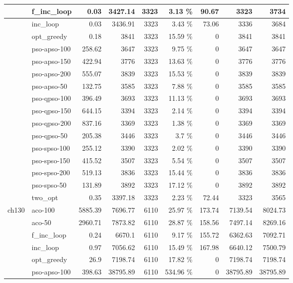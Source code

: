 \documentclass[conference]{IEEEtran}
\begin{document}
\begin{center}
\begin{longtable}[ht]{|l|l|r|r|r|r|r|r|r|}
 & f\_inc\_loop & 0.03 & 3427.14 & 3323 & 3.13 \% & 90.67 & 3323 & 3734 \\ \hline
 & inc\_loop & 0.03 & 3436.91 & 3323 & 3.43 \% & 73.06 & 3336 & 3684 \\ \hline
 & opt\_greedy & 0.18 & 3841 & 3323 & 15.59 \% & 0 & 3841 & 3841 \\ \hline
 & pso-apso-100 & 258.62 & 3647 & 3323 & 9.75 \% & 0 & 3647 & 3647 \\ \hline
 & pso-apso-150 & 422.94 & 3776 & 3323 & 13.63 \% & 0 & 3776 & 3776 \\ \hline
 & pso-apso-200 & 555.07 & 3839 & 3323 & 15.53 \% & 0 & 3839 & 3839 \\ \hline
 & pso-apso-50 & 132.75 & 3585 & 3323 & 7.88 \% & 0 & 3585 & 3585 \\ \hline
 & pso-qpso-100 & 396.49 & 3693 & 3323 & 11.13 \% & 0 & 3693 & 3693 \\ \hline
 & pso-qpso-150 & 644.15 & 3394 & 3323 & 2.14 \% & 0 & 3394 & 3394 \\ \hline
 & pso-qpso-200 & 837.16 & 3369 & 3323 & 1.38 \% & 0 & 3369 & 3369 \\ \hline
 & pso-qpso-50 & 205.38 & 3446 & 3323 & 3.7 \% & 0 & 3446 & 3446 \\ \hline
 & pso-spso-100 & 255.12 & 3390 & 3323 & 2.02 \% & 0 & 3390 & 3390 \\ \hline
 & pso-spso-150 & 415.52 & 3507 & 3323 & 5.54 \% & 0 & 3507 & 3507 \\ \hline
 & pso-spso-200 & 519.13 & 3836 & 3323 & 15.44 \% & 0 & 3836 & 3836 \\ \hline
 & pso-spso-50 & 131.89 & 3892 & 3323 & 17.12 \% & 0 & 3892 & 3892 \\ \hline
 & two\_opt & 0.35 & 3397.18 & 3323 & 2.23 \% & 72.44 & 3323 & 3565 \\ \hline
ch130 & aco-100 & 5885.39 & 7696.77 & 6110 & 25.97 \% & 173.74 & 7139.54 & 8024.73 \\ \hline
 & aco-50 & 2960.71 & 7873.82 & 6110 & 28.87 \% & 158.56 & 7497.14 & 8269.16 \\ \hline
 & f\_inc\_loop & 0.24 & 6670.1 & 6110 & 9.17 \% & 155.72 & 6362.63 & 7092.71 \\ \hline
 & inc\_loop & 0.97 & 7056.62 & 6110 & 15.49 \% & 167.98 & 6640.12 & 7500.79 \\ \hline
 & opt\_greedy & 26.9 & 7198.74 & 6110 & 17.82 \% & 0 & 7198.74 & 7198.74 \\ \hline
 & pso-apso-100 & 398.63 & 38795.89 & 6110 & 534.96 \% & 0 & 38795.89 & 38795.89 \\ \hline

\end{longtable}
\end{center}
\end{document}
